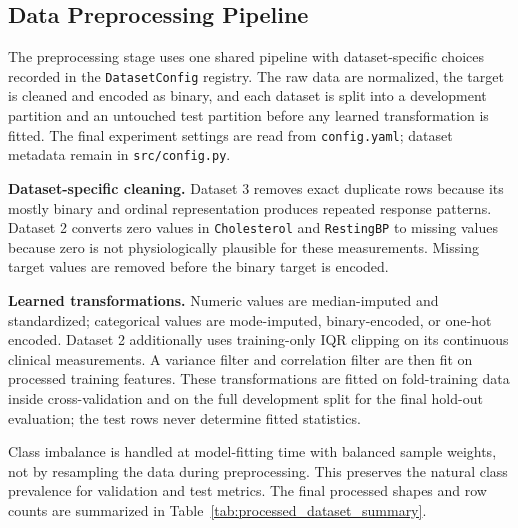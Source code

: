 \subsection{Data Preprocessing Pipeline}
\label{subsec:data_preprocessing}

The preprocessing stage uses one shared pipeline with dataset-specific choices
recorded in the \texttt{DatasetConfig} registry. The raw data are normalized,
the target is cleaned and encoded as binary, and each dataset is split into a
development partition and an untouched test partition before any learned
transformation is fitted. The final experiment settings are read from
\texttt{config.yaml}; dataset metadata remain in \texttt{src/config.py}.

\textbf{Dataset-specific cleaning.} Dataset 3 removes exact duplicate rows
because its mostly binary and ordinal representation produces repeated response
patterns. Dataset 2 converts zero values in \texttt{Cholesterol} and
\texttt{RestingBP} to missing values because zero is not physiologically
plausible for these measurements. Missing target values are removed before the
binary target is encoded.

\textbf{Learned transformations.} Numeric values are median-imputed and
standardized; categorical values are mode-imputed, binary-encoded, or one-hot
encoded. Dataset 2 additionally uses training-only IQR clipping on its
continuous clinical measurements. A variance filter and correlation filter are
then fit on processed training features. These transformations are fitted on
fold-training data inside cross-validation and on the full development split
for the final hold-out evaluation; the test rows never determine fitted
statistics.

Class imbalance is handled at model-fitting time with balanced sample weights,
not by resampling the data during preprocessing. This preserves the natural
class prevalence for validation and test metrics. The final processed shapes
and row counts are summarized in Table~\ref{tab:processed_dataset_summary}.

